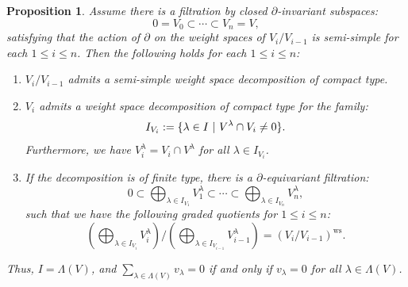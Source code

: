 \documentclass{amsart}
\newtheorem{prop}[defi]{ Proposition}
\begin{document}
\begin{prop}\label{prop ws decomposition and filtrations}
Assume there is a filtration by closed $\partial$-invariant subspaces:
\begin{equation*}
    0= V_{0}\subset \cdots \subset V_{n}=V,
\end{equation*}
satisfying that the action of $\partial$ on the weight spaces of $V_{i}/V_{i-1}$ is semi-simple for each $1\leq i \leq n$. Then the following holds for each $1\leq i \leq n$:
\begin{enumerate}[label=(\roman*)]
\item $V_{i}/V_{i-1}$ admits a semi-simple weight space decomposition of compact type.
    \item $V_i$ admits a weight space decomposition of compact type for the family:
    \begin{equation*}
        I_{V_i}:= \{ \lambda \in I \textnormal{ }\vert \textnormal{ } V^{\lambda}\cap V_{i}\neq 0  \}.
    \end{equation*}
    Furthermore, we have $V_{i}^{\lambda}=V_i\cap V^{\lambda}$ for all $\lambda \in I_{V_i}$.
    \item If the decomposition is of finite type, there is a $\partial$-equivariant filtration:
    \begin{equation*}
        0\subset \bigoplus_{\lambda\in I_{V_1}}V_{1}^{\lambda} \subset \cdots  \subset\bigoplus_{\lambda\in I_{V_n}}V_{n}^{\lambda},
    \end{equation*}
such that we have the following graded quotients for $1\leq i \leq n$:
\begin{equation*}
   \left(\bigoplus_{\lambda\in I_{V_i}}V_{i}^{\lambda}\right)/\left(\bigoplus_{\lambda\in I_{V_{i-1}}}V_{i-1}^{\lambda}\right)=(V_i/V_{i-1})^{\operatorname{ws}}. 
\end{equation*}  
\end{enumerate}
Thus, $I=\Lambda(V)$, and  $\sum_{\lambda\in\Lambda(V)}v_{\lambda}=0$ if and only if $v_{\lambda}=0$ for all $\lambda\in\Lambda(V)$.
\end{prop}
\end{document}
